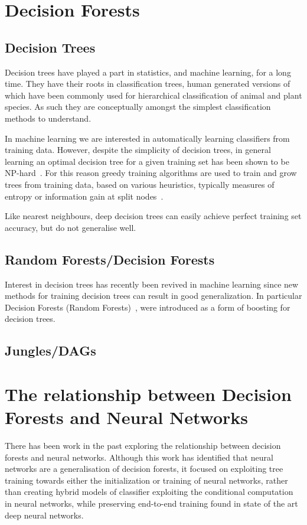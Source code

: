 \documentclass[thesis]{subfiles}
\begin{document}
\section{Decision Forests}
\subsection{Decision Trees}
Decision trees have played a part in statistics, and machine learning, for a long time. They have their roots in classification trees, human generated versions of which have been commonly used for hierarchical classification of animal and plant species. As such they are conceptually amongst the simplest classification methods to understand. 

In machine learning we are interested in automatically learning classifiers from training data. However, despite the simplicity of decision trees, in general learning an optimal decision tree for a given training set has been shown to be NP-hard~\cite{journals/iandc/HancockJLT96}. For this reason greedy training algorithms are used to train and grow trees from training data, based on various heuristics, typically measures of entropy or information gain at split nodes~\cite{breiman84}. 

Like nearest neighbours, deep decision trees can easily achieve perfect training set accuracy, but do not generalise well. 

\subsection{Random Forests/Decision Forests}
Interest in decision trees has recently been revived in machine learning since new methods for training decision trees can result in good generalization. In particular Decision Forests (Random Forests)~\cite{journals/neco/AmitG97,breiman2001random}, were introduced as a form of boosting for decision trees.
\subsection{Jungles/DAGs}

\section{The relationship between Decision Forests and Neural Networks}
There has been work in the past exploring the relationship between decision forests and neural networks. Although this work has identified that neural networks are a generalisation of decision forests, it focused on exploiting tree training towards either the initialization or training of neural networks, rather than creating hybrid models of classifier exploiting the conditional computation in neural networks, while preserving end-to-end training found in state of the art deep neural networks.
\end{document}

